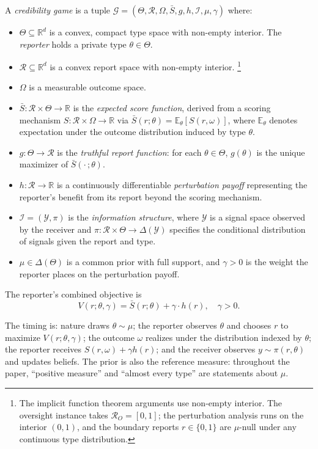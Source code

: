 \documentclass[acmsmall,nonacm,screen]{acmart}
\theoremstyle{acmplain}%
\theoremstyle{acmdefinition}%
\newcommand{\R}{\mathbb{R}}
\newcommand{\E}{\mathbb{E}}
\newcommand{\calG}{\mathcal{G}}
\newcommand{\calR}{\mathcal{R}}
\newcommand{\calI}{\mathcal{I}}
\newcommand{\calY}{\mathcal{Y}}
\newcommand{\Sbar}{\bar{S}}
\numberwithin{equation}{section}
\begin{document}
\begin{definition}\label{def:credibility-game}
A \emph{credibility game} is a tuple $\calG = (\Theta, \calR, \Omega, \Sbar, g, h, \calI, \mu, \gamma)$ where:
\begin{itemize}
\item $\Theta \subseteq \R^d$ is a convex, compact type space with non-empty interior. The \emph{reporter} holds a private type $\theta \in \Theta$.
\item $\calR \subseteq \R^d$ is a convex report space with non-empty interior.%
\footnote{The implicit function theorem arguments use non-empty interior. The oversight instance takes $\calR_O = [0,1]$; the perturbation analysis runs on the interior $(0,1)$, and the boundary reports $r \in \{0,1\}$ are $\mu$-null under any continuous type distribution.}
\item $\Omega$ is a measurable outcome space.
\item $\Sbar: \calR \times \Theta \to \R$ is the \emph{expected score function}, derived from a scoring mechanism $S: \calR \times \Omega \to \R$ via $\Sbar(r;\theta) = \E_\theta[S(r,\omega)]$, where $\E_\theta$ denotes expectation under the outcome distribution induced by type $\theta$.
\item $g: \Theta \to \calR$ is the \emph{truthful report function}: for each $\theta \in \Theta$, $g(\theta)$ is the unique maximizer of $\Sbar(\cdot\,;\theta)$.
\item $h: \calR \to \R$ is a continuously differentiable \emph{perturbation payoff} representing the reporter's benefit from its report beyond the scoring mechanism.
\item $\calI = (\calY, \pi)$ is the \emph{information structure}, where $\calY$ is a signal space observed by the receiver and $\pi: \calR \times \Theta \to \Delta(\calY)$ specifies the conditional distribution of signals given the report and type.
\item $\mu \in \Delta(\Theta)$ is a common prior with full support, and $\gamma > 0$ is the weight the reporter places on the perturbation payoff.
\end{itemize}
The reporter's combined objective is
\begin{equation}\label{eq:combined-objective}
V(r;\theta,\gamma) = \Sbar(r;\theta) + \gamma \cdot h(r), \quad \gamma > 0.
\end{equation}
\end{definition}

The timing is: nature draws $\theta \sim \mu$; the reporter observes $\theta$ and chooses $r$ to maximize $V(r;\theta,\gamma)$; the outcome $\omega$ realizes under the distribution indexed by $\theta$; the reporter receives $S(r,\omega) + \gamma h(r)$; and the receiver observes $y \sim \pi(r,\theta)$ and updates beliefs. The prior is also the reference measure: throughout the paper, ``positive measure'' and ``almost every type'' are statements about $\mu$.
\end{document}
